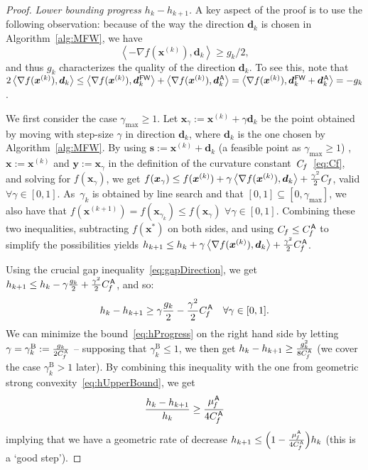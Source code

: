 \documentclass{article} %
\newcommand{\stepsize}{\gamma}
\newcommand{\stepbound}{\stepsize^\textrm{B}} %
\newcommand{\FW}{{\hspace{0.05em}\textsf{FW}}}
\newcommand{\away}{{\hspace{0.06em}\textsf{A}}}
\newcommand{\Cf}{C_{\hspace{-0.08em}f}}
\newcommand{\CfMFW}{C_{\hspace{-0.08em}f}^\away}
\newcommand{\strongConvMFW}{\mu_{\hspace{-0.08em}f}^\away}
\newcommand{\x}{\bm{x}}
\newcommand{\y}{\bm{y}}
\newcommand{\s}{\bm{s}}
\newcommand{\dd}{\bm{d}}
\newcommand{\0}{\mathbf{0}} %
\begin{document}
\begin{proof}
\emph{Lower bounding progress $h_k-h_{k+1}$.} A key aspect of the proof is to use the following observation: because of the way the direction $\dd_k$ is chosen in Algorithm~\ref{alg:MFW}, we have 
\begin{equation} \label{eq:gapDirection}
	\left\langle  -\nabla f(\x^{(k)}), \dd_k \right\rangle \geq g_k/2 , %
\end{equation}
and thus $g_k$ characterizes the quality of the direction $\dd_k$. To see this, note that $2 \left\langle  \nabla f(\x^{(k)}), \dd_k \right\rangle \leq  \left\langle \nabla f(\x^{(k)}), \dd_k^\FW\right\rangle  + \left\langle \nabla f(\x^{(k)}), \dd_k^\away\right\rangle = \left\langle \nabla f(\x^{(k)}), \dd_k^\FW+\dd_k^\away\right\rangle = -g_k$.

We first consider the case $\stepsize_\textrm{max} \geq 1$. Let $\x_\stepsize :=  \x^{(k)} + \stepsize \dd_k$ be the point obtained by moving with step-size $\stepsize$ in direction $\dd_k$, where $\dd_k$ is the one chosen by Algorithm~\ref{alg:MFW}. By using $\s := \x^{(k)} + \dd_k$ (a feasible point as $\stepsize_\textrm{max} \geq 1$)%
, $\x := \x^{(k)}$ and $\y := \x_\stepsize$ in the definition of the curvature constant~$\Cf$~\eqref{eq:Cf}, and solving for $f(\x_\stepsize)$, we get $f(\x_\stepsize) \leq f(\x^{(k)}) + \stepsize \left\langle  \nabla f(\x^{(k)}), \dd_k \right\rangle + \frac{\stepsize^2}{2} \Cf$, valid $\forall \stepsize \in [0,1]$. As~$\stepsize_k$ is obtained by line search and that $[0,1] \subseteq [0,\stepsize_\textrm{max}]$, we also have that $f(\x^{(k+1)}) = f(\x_{\stepsize_k}) \leq  f(\x_\stepsize)$ $\forall \stepsize \in [0,1]$. Combining these two inequalities, subtracting $f(\x^*)$ on both sides, and using $\Cf \leq \CfMFW$ to simplify the possibilities yields $h_{k+1} \le h_k + \stepsize \left\langle  \nabla f(\x^{(k)}), \dd_k \right\rangle + \frac{\stepsize^2}{2} \CfMFW$.

Using the crucial gap inequality~\eqref{eq:gapDirection}, we get $h_{k+1} \le h_k - \stepsize \frac{g_k}{2} + \frac{\stepsize^2}{2} \CfMFW$, and so:
\begin{equation} \label{eq:hProgress}
h_k - h_{k+1} \ge \stepsize \frac{g_k}{2} - \frac{\stepsize^2}{2} \CfMFW \quad \forall \stepsize \in [0,1].  
\end{equation}
We can minimize the bound~\eqref{eq:hProgress} on the right hand side by letting $\stepsize = \stepbound_k := \frac{g_k}{2\CfMFW}$ -- supposing that $\stepbound_k \leq 1$, we then get $h_k - h_{k+1} \geq  \frac{g_k^2}{8\CfMFW}$ (we cover the case $\stepbound_k > 1$ later).  By combining this inequality with the one from geometric strong convexity~\eqref{eq:hUpperBound}, we get 
\begin{equation} \label{eq:mainGeometric}
\frac{h_k - h_{k+1} }{h_k} \ge \frac{\strongConvMFW}{4\CfMFW} \vspace{-1mm}
\end{equation}
implying that we have a geometric rate of decrease $h_{k+1} \leq \Big(1-\frac{\strongConvMFW}{4\CfMFW}\Big) h_k$ (this is a `good step').


\end{proof}
\end{document}
